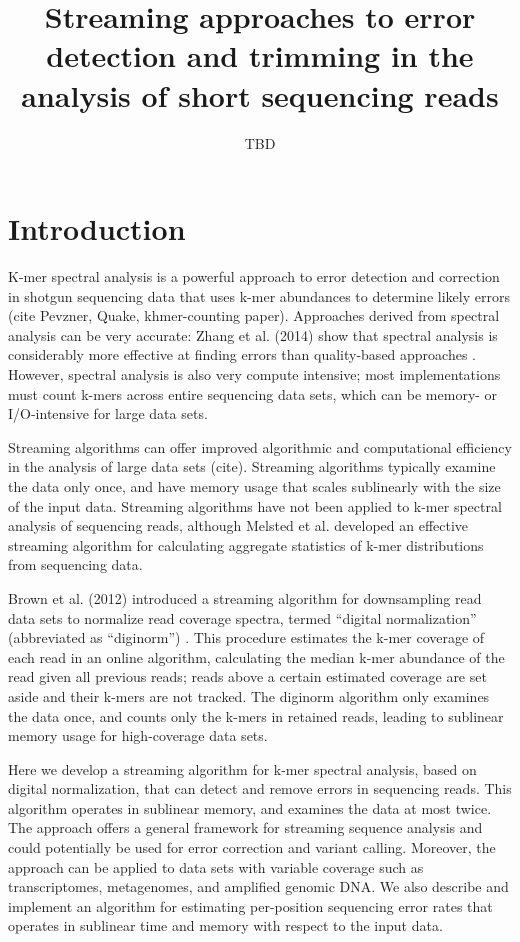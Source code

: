 \documentclass{article}
\begin{document}
\title{Streaming approaches to error detection and trimming in the analysis of
short sequencing reads}
\author{TBD}
\maketitle

\section{Introduction}

K-mer spectral analysis is a powerful approach to error detection and
correction in shotgun sequencing data that uses k-mer abundances to
determine likely errors (cite Pevzner, Quake, khmer-counting paper).
Approaches derived from spectral analysis can be very accurate: Zhang
et al. (2014) show that spectral analysis is considerably more
effective at finding errors than quality-based approaches \cite{Zhang2014}.
However, spectral analysis is also very compute intensive; most
implementations must count k-mers across entire sequencing data sets,
which can be memory- or I/O-intensive for large data sets.

Streaming algorithms can offer improved algorithmic and computational
efficiency in the analysis of large data sets (cite).  Streaming
algorithms typically examine the data only once, and have memory usage
that scales sublinearly with the size of the input data.  Streaming
algorithms have not been applied to k-mer spectral analysis of
sequencing reads, although Melsted et al. developed an effective
streaming algorithm for calculating aggregate statistics of k-mer
distributions from sequencing data.

Brown et al. (2012) introduced a streaming algorithm for downsampling
read data sets to normalize read coverage spectra, termed ``digital
normalization'' (abbreviated as ``diginorm'') \cite{Brown2012}.  This procedure
estimates the k-mer coverage of each read in an online algorithm,
calculating the median k-mer abundance of the read given all previous
reads; reads above a certain estimated coverage are set aside and
their k-mers are not tracked.  The diginorm algorithm only examines
the data once, and counts only the k-mers in retained reads, leading
to sublinear memory usage for high-coverage data sets.

Here we develop a streaming algorithm for k-mer spectral analysis,
based on digital normalization, that can detect and remove errors in
sequencing reads.  This algorithm operates in sublinear memory, and
examines the data at most twice.  The approach offers a general
framework for streaming sequence analysis and could potentially be
used for error correction and variant calling.  Moreover, the approach
can be applied to data sets with variable coverage such as
transcriptomes, metagenomes, and amplified genomic DNA.  We also
describe and implement an algorithm for estimating per-position
sequencing error rates that operates in sublinear time and memory with
respect to the input data.
\end{document}
